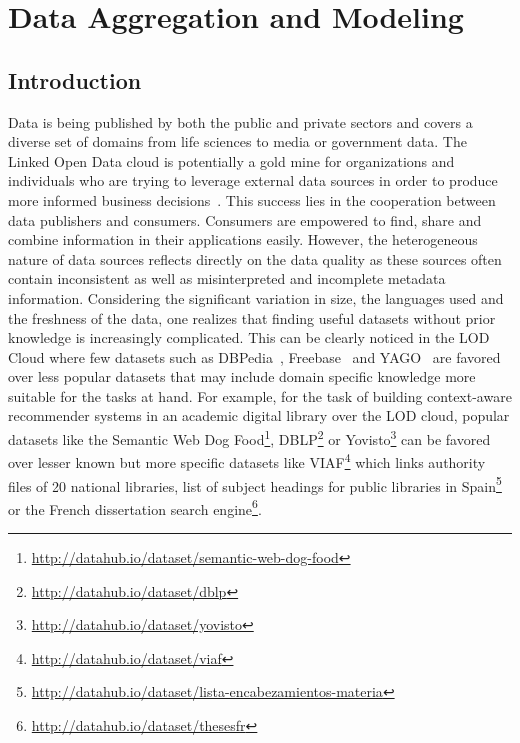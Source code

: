 \chapter{Data Aggregation and Modeling}\label{chapter:roomba}
\graphicspath{{Part1/Chapter2/figures/}}

\section{Introduction}

Data is being published by both the public and private sectors and covers a diverse set of domains from life sciences to media or government data. The Linked Open Data cloud is potentially a gold mine for organizations and individuals who are trying to leverage external data sources in order to produce more informed business decisions~\cite{Boyd:Article:11}. This success lies in the cooperation between data publishers and consumers. Consumers are empowered to find, share and combine information in their applications easily. However, the heterogeneous nature of data sources reflects directly on the data quality as these sources often contain inconsistent as well as misinterpreted and incomplete metadata information. Considering the significant variation in size, the languages used and the freshness of the data, one realizes that finding useful datasets without prior knowledge is increasingly complicated. This can be clearly noticed in the LOD Cloud where few datasets such as DBPedia~\cite{Bizer:WebSemJorunal:09}, Freebase~\cite{Bollacker:SIGMOD:08} and YAGO~\cite{Suchanek::WWW:07} are favored over less popular datasets that may include domain specific knowledge more suitable for the tasks at hand. For example, for the task of building context-aware recommender systems in an academic digital library over the LOD cloud, popular datasets like the Semantic Web Dog Food\footnote{\url{http://datahub.io/dataset/semantic-web-dog-food}}, DBLP\footnote{\url{http://datahub.io/dataset/dblp}} or Yovisto\footnote{\url{http://datahub.io/dataset/yovisto}} can be favored over lesser known but more specific datasets like VIAF\footnote{\url{http://datahub.io/dataset/viaf}} which links authority files of 20 national libraries, list of subject headings for public libraries in Spain\footnote{\url{http://datahub.io/dataset/lista-encabezamientos-materia}} or the French dissertation search engine\footnote{\url{http://datahub.io/dataset/thesesfr}}.

